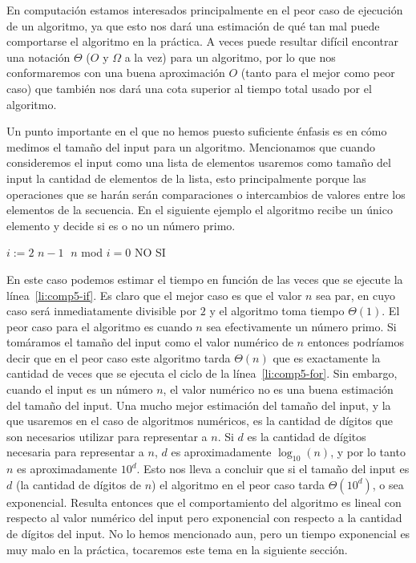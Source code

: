 En computación estamos interesados principalmente en el peor caso de ejecución de un algoritmo, ya que esto nos dará una estimación de qué tan mal puede comportarse el algoritmo en la práctica.
A veces puede resultar difícil encontrar una notación $\Theta$ ($O$ y $\Omega$ a la vez) para un algoritmo, por lo que nos conformaremos con una buena aproximación $O$ (tanto para el mejor como peor caso) que también nos dará una cota superior al tiempo total usado por el algoritmo.

Un punto importante en el que no hemos puesto suficiente énfasis es en cómo medimos el tamaño del input para un algoritmo.
Mencionamos que cuando consideremos el input como una lista de elementos usaremos como tamaño del input la cantidad de elementos de la lista, esto principalmente porque las operaciones que se harán serán comparaciones o intercambios de valores entre los elementos de la secuencia.
En el siguiente ejemplo el algoritmo recibe un único elemento y decide si es o no un número primo.
\begin{codebox}
\li \For $i:=2$ \To $n-1$ \label{li:comp5-for}
\li \> \If  $\;n$ mod $i=0$ \Then \label{li:comp5-if}
\li \> \> \Return NO
\li \Return SI
\end{codebox}

En este caso podemos estimar el tiempo en función de las veces que se ejecute la línea~\ref{li:comp5-if}.
Es claro que el mejor caso es que el valor $n$ sea par, en cuyo caso será inmediatamente divisible por $2$ y el algoritmo toma tiempo $\Theta(1)$.
El peor caso para el algoritmo es cuando $n$ sea efectivamente un número primo.
Si tomáramos el tamaño del input como el valor numérico de $n$ entonces podríamos decir que en el peor caso este algoritmo tarda $\Theta(n)$ que es exactamente la cantidad de veces que se ejecuta el ciclo de la línea~\ref{li:comp5-for}.
Sin embargo, cuando el input es un número $n$, el valor numérico no es una buena estimación del tamaño del input.
Una mucho mejor estimación del tamaño del input, y la que usaremos en el caso de algoritmos numéricos, es la cantidad de dígitos que son necesarios utilizar para representar a $n$.
Si $d$ es la cantidad de dígitos necesaria para representar a $n$, $d$ es aproximadamente $\log_{10}(n)$, y por lo tanto $n$ es aproximadamente $10^d$.
Esto nos lleva a concluir que si el tamaño del input es $d$ (la cantidad de dígitos de $n$) el algoritmo en el peor caso tarda $\Theta(10^d)$, o sea exponencial.
Resulta entonces que el comportamiento del algoritmo es lineal con respecto al valor numérico del input pero exponencial con respecto a la cantidad de dígitos del input.
No lo hemos mencionado aun, pero un tiempo exponencial es muy malo en la práctica, tocaremos este tema en la siguiente sección.

